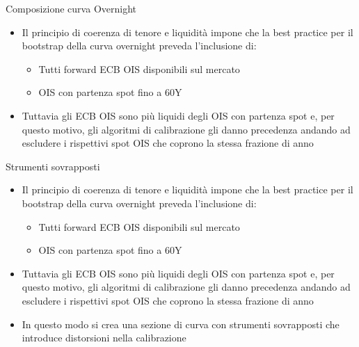 \begin{tframe}{Composizione curva Overnight}
\begin{itemize}
\item Il principio di coerenza di tenore e liquidità impone che la best practice per il bootstrap della curva overnight preveda l'inclusione di:
    \begin{itemize}
    \item Tutti forward ECB OIS disponibili sul mercato
    \item OIS con partenza spot fino a 60Y
    \end{itemize}
\item Tuttavia gli ECB OIS sono più liquidi degli OIS con partenza spot e, per questo motivo, gli algoritmi di calibrazione gli danno precedenza andando ad escludere i rispettivi spot OIS che coprono la stessa frazione di anno    
\end{itemize}
\end{tframe}
\begin{tframe}{Strumenti sovrapposti}
\begin{itemize}
\item Il principio di coerenza di tenore e liquidità impone che la best practice per il bootstrap della curva overnight preveda l'inclusione di:
    \begin{itemize}
    \item Tutti forward ECB OIS disponibili sul mercato
    \item OIS con partenza spot fino a 60Y
    \end{itemize}
\item Tuttavia gli ECB OIS sono più liquidi degli OIS con partenza spot e, per questo motivo, gli algoritmi di calibrazione gli danno precedenza andando ad escludere i rispettivi spot OIS che coprono la stessa frazione di anno 
\item In questo modo si crea una sezione di curva con strumenti sovrapposti che introduce distorsioni nella calibrazione
\end{itemize}
\end{tframe}
